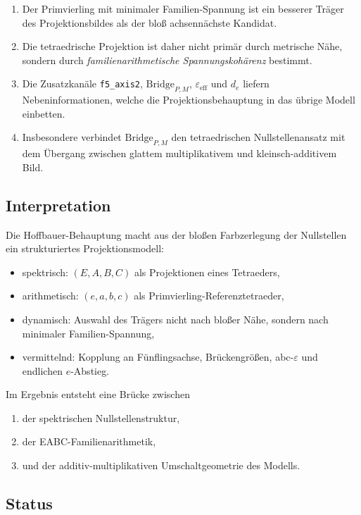 \documentclass[11pt,a4paper]{article}
\theoremstyle{definition}
\begin{document}
\begin{enumerate}
	\item Der Primvierling mit minimaler Familien-Spannung ist ein besserer Träger des Projektionsbildes als der bloß achsennächste Kandidat.
	\item Die tetraedrische Projektion ist daher nicht primär durch metrische Nähe, sondern durch \emph{familienarithmetische Spannungskohärenz} bestimmt.
	\item Die Zusatzkanäle \texttt{f5\_axis2}, \(\mathrm{Bridge}_{P,M}\), \(\varepsilon_{\mathrm{eff}}\) und \(d_e\) liefern Nebeninformationen, welche die Projektionsbehauptung in das übrige Modell einbetten.
	\item Insbesondere verbindet \(\mathrm{Bridge}_{P,M}\) den tetraedrischen Nullstellenansatz mit dem Übergang zwischen glattem multiplikativem und kleinsch-additivem Bild.
\end{enumerate}

\subsection{Interpretation}

Die Hoffbauer-Behauptung macht aus der bloßen Farbzerlegung der Nullstellen ein strukturiertes Projektionsmodell:

\begin{itemize}
	\item spektrisch: \((E,A,B,C)\) als Projektionen eines Tetraeders,
	\item arithmetisch: \((e,a,b,c)\) als Primvierling-Referenztetraeder,
	\item dynamisch: Auswahl des Trägers nicht nach bloßer Nähe, sondern nach minimaler Familien-Spannung,
	\item vermittelnd: Kopplung an Fünflingsachse, Brückengrößen, abc-\(\varepsilon\) und endlichen \(e\)-Abstieg.
\end{itemize}

Im Ergebnis entsteht eine Brücke zwischen

\begin{enumerate}
	\item der spektrischen Nullstellenstruktur,
	\item der EABC-Familienarithmetik,
	\item und der additiv-multiplikativen Umschaltgeometrie des Modells.
\end{enumerate}

\subsection{Status}
\end{document}
